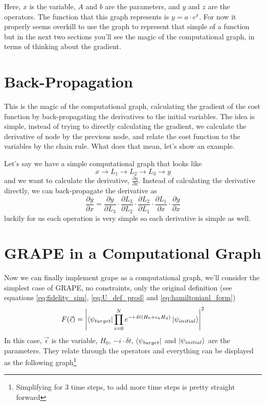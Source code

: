 Here, $x$ is the variable, $A$ and $b$ are the parameters, and $y$ and $z$ are the operators. The function that this graph represents is $y = a \cdot e^{x}$. For now it properly seems overkill to use the graph to represent that simple of a function but in the next two sections you'll see the magic of the computational graph, in terms of thinking about the gradient.

\section{Back-Propagation}
This is the magic of the computational graph, calculating the gradient of the cost function by back-propagating the derivatives to the initial variables. The idea is simple, instead of trying to directly calculating the gradient, we calculate the derivative of node by the previous node, and relate the cost function to the variables by the chain rule. What does that mean, let's show an example.

Let's say we have a simple computational graph that looks like
\[x \rightarrow L_1 \rightarrow L_2 \rightarrow L_3 \rightarrow y\] 
and we want to calculate the derivative, $\frac{\partial y}{\partial x}$. Instead of calculating the derivative directly, we can back-propagate the derivative as
\[\frac{\partial y}{\partial x} = \frac{\partial y}{\partial L_3} \cdot \frac{\partial L_3}{\partial L_2} \cdot \frac{\partial L_2}{\partial L_1} \cdot \frac{\partial L_1}{\partial x} \cdot \frac{\partial y}{\partial x}\]
luckily for us each operation is very simple so each derivative is simple as well.

\section{GRAPE in a Computational Graph}
Now we can finally implement grape as a computational graph, we'll consider the simplest case of GRAPE, no constraints, only the original definition (see equations \ref{eq:fidelity_sim}, \ref{eq:U_def_prod} and \ref{eq:hamiltonianl_form})%
\[
    F (\vec{\epsilon}) = \abs{\bra{\psi_{target}} \prod_{i=0}^N e^{-i \cdot \delta t  (H_0 + \epsilon_k H_d)} \ket{\psi_{initial}}}^2
\]
In this case, $\vec{\epsilon}$ is the variable, $H_0$, $-i \cdot \delta t$, $\bra{\psi_{target}}$ and $\ket{\psi_{initial}}$ are the parameters. They relate through the operators and everything can be displayed as the following graph\footnote{Simplifying for 3 time steps, to add more time steps is pretty straight forward}

